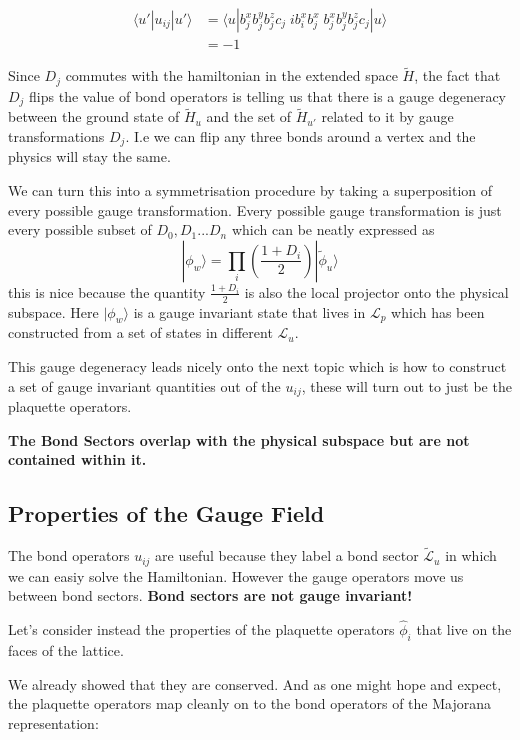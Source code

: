 \[ \begin{aligned}
\langle u'|u_{ij}|u'\rangle &=  \langle u| b_j^x b_j^y b_j^z c_j \;ib^x_i b^x_j\; b_j^x b_j^y b_j^z c_j|u\rangle\\
&= -1
\end{aligned}\]

Since \(D_j\) commutes with the hamiltonian in the extended space
\(\tilde{H}\), the fact that \(D_j\) flips the value of bond operators
is telling us that there is a gauge degeneracy between the ground state
of \(\tilde{H}_u\) and the set of \(\tilde{H}_{u'}\) related to it by
gauge transformations \(D_j\). I.e we can flip any three bonds around a
vertex and the physics will stay the same.

We can turn this into a symmetrisation procedure by taking a
superposition of every possible gauge transformation. Every possible
gauge transformation is just every possible subset of
\({D_0, D_1 ... D_n}\) which can be neatly expressed as
\[|\phi_w\rangle = \prod_i \left( \frac{1 + D_i}{2}\right) |\tilde{\phi}_u\rangle\]
this is nice because the quantity \(\frac{1 + D_i}{2}\) is also the
local projector onto the physical subspace. Here \(|\phi_w\rangle\) is a
gauge invariant state that lives in \(\mathcal{L}_p\) which has been
constructed from a set of states in different \(\mathcal{L}_u\).

This gauge degeneracy leads nicely onto the next topic which is how to
construct a set of gauge invariant quantities out of the \(u_{ij}\),
these will turn out to just be the plaquette operators.

\textbf{The Bond Sectors overlap with the physical subspace but are not
contained within it.}

\hypertarget{properties-of-the-gauge-field}{%
\subsection{Properties of the Gauge
Field}\label{properties-of-the-gauge-field}}

The bond operators \(u_{ij}\) are useful because they label a bond
sector \(\mathcal{\tilde{L}}_u\) in which we can easiy solve the
Hamiltonian. However the gauge operators move us between bond sectors.
\textbf{Bond sectors are not gauge invariant!}

Let's consider instead the properties of the plaquette operators
\(\hat{\phi}_i\) that live on the faces of the lattice.

We already showed that they are conserved. And as one might hope and
expect, the plaquette operators map cleanly on to the bond operators of
the Majorana representation:

